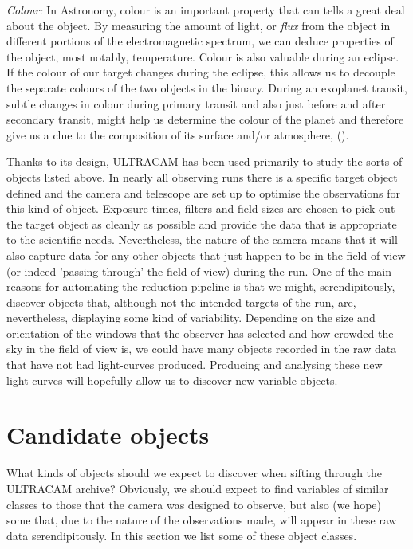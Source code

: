 \emph{Colour:} In Astronomy, colour is an important property that can tells a great deal about the object. By measuring the amount of light, or \emph{flux} from the object in different portions of the electromagnetic spectrum, we can deduce properties of the object, most notably, temperature. Colour is also valuable during an eclipse. If the colour of our target changes during the eclipse, this allows us to decouple the separate colours of the two objects in the binary. During an exoplanet transit, subtle changes in colour during primary transit and also just before and after secondary transit, might help us determine the colour of the planet and therefore give us a clue to the composition of its surface and/or atmosphere, (\cite{2012ApJS..201...36B}).

Thanks to its design, ULTRACAM has been used primarily to study the sorts of objects listed above. In nearly all observing runs there is a specific target object defined and the camera and telescope are set up to optimise the observations for this kind of object. Exposure times, filters and field sizes are chosen to pick out the target object as cleanly as possible and provide the data that is appropriate to the scientific needs. Nevertheless, the nature of the camera means that it will also capture data for any other objects that just happen to be in the field of view (or indeed 'passing-through' the field of view) during the run. One of the main reasons for automating the reduction pipeline is that we might, serendipitously, discover objects that, although not the intended targets of the run, are, nevertheless, displaying some kind of variability. Depending on the size and orientation of the windows that the observer has selected and how crowded the sky in the field of view is, we could have many objects recorded in the raw data that have not had light-curves produced. Producing and analysing these new light-curves will hopefully allow us to discover new variable objects. 

\section{Candidate objects}
What kinds of objects should we expect to discover when sifting through the ULTRACAM archive? Obviously, we should expect to find variables of similar classes to those that the camera was designed to observe, but also (we hope) some that, due to the nature of the observations made, will appear in these raw data serendipitously.  In this section we list some of these object classes. 

